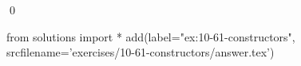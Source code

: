 
\begin{ex}
  \label{ex:10-61-constructors}
  
  \qed
\end{ex}
\begin{python0}
from solutions import *
add(label="ex:10-61-constructors",
    srcfilename='exercises/10-61-constructors/answer.tex')
\end{python0}
